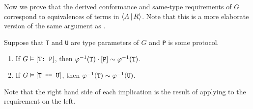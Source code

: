 \documentclass[../generics]{subfiles}
\begin{document}
Now we prove that the derived conformance and same-type requirements of $G$ correspond to equivalences of terms in $\langle A\,|\,R\rangle$. Note that this is a more elaborate version of the same argument as .
\begin{theorem}\label{derivation to path swift}
Suppose that \texttt{T} and \texttt{U} are type parameters of $G$ and \texttt{P} is some protocol.
\begin{enumerate}
\item If $G\vDash[\texttt{T:~P}]$, then $\varphi^{-1}(\texttt{T})\cdot[\texttt{P}]\sim\varphi^{-1}(\texttt{T})$.
\item If $G\vDash[\texttt{T == U}]$, then $\varphi^{-1}(\texttt{T})\sim\varphi^{-1}(\texttt{U})$.
\end{enumerate}
Note that the right hand side of each implication is the result of applying  to the requirement on the left.
\end{theorem}
\end{document}
